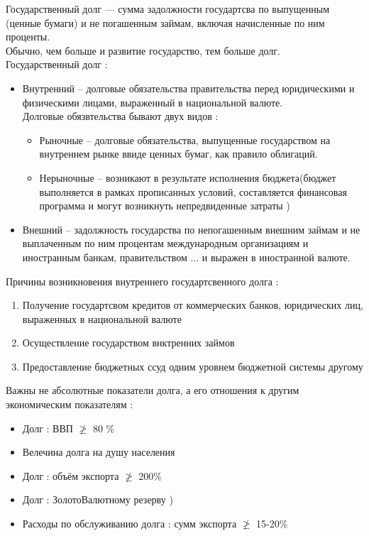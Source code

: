 \documentclass[12pt,a4paper]{book}
\begin{document}
Государственный долг --- сумма задолжности государтсва по выпущенным (ценные бумаги) и не погашенным  займам, включая начисленные по ним проценты.\\
Обычно, чем больше и развитие государство, тем больше долг.\\
Государственный долг :
\begin{itemize}
	\item Внутренний -- долговые обязательства правительства перед юридическими и физическими лицами, выраженный в национальной валюте.\\
	Долговые обязвтельства бывают двух видов :
	\begin{itemize}
		\item Рыночные -- долговые обязательства, выпущенные государством на внутреннем рынке ввиде ценных бумаг, как правило облигаций.
		\item Нерыночные -- возникают в результате исполнения бюджета(бюджет выполняется в рамках прописанных условий, составляется финансовая программа и могут возникнуть непредвиденные затраты )
	\end{itemize}
	\item Внешний -- задолжность государства по непогашенным внешним займам  и не выплаченным по ним процентам международным организациям и иностранным банкам, правительством  ... и выражен в иностранной валюте.
\end{itemize}
Причины возникновения внутреннего государтсвенного долга :
\begin{enumerate}
	\item Получение государтсвом кредитов от коммерческих банков, юридических лиц, выраженных в национальной валюте
	\item Осуществление государством внктренних займов
	\item Предоставление бюджетных ссуд одним уровнем бюджетной системы другому
\end{enumerate}
Важны не абсолютные показатели долга, а его отношения к другим экономическим показателям :
\begin{itemize}
	\item Долг : ВВП $\ngeqslant$ 80 \%
	\item  Велечина долга на душу населения
	\item  Долг : объём экспорта $ \ngeqslant$ 200\%
	\item  Долг : ЗолотоВалютному резерву )
	\item Расходы по обслуживанию долга : сумм экспорта $\ngeqslant$ 15-20\%
\end{itemize}
\end{document}
